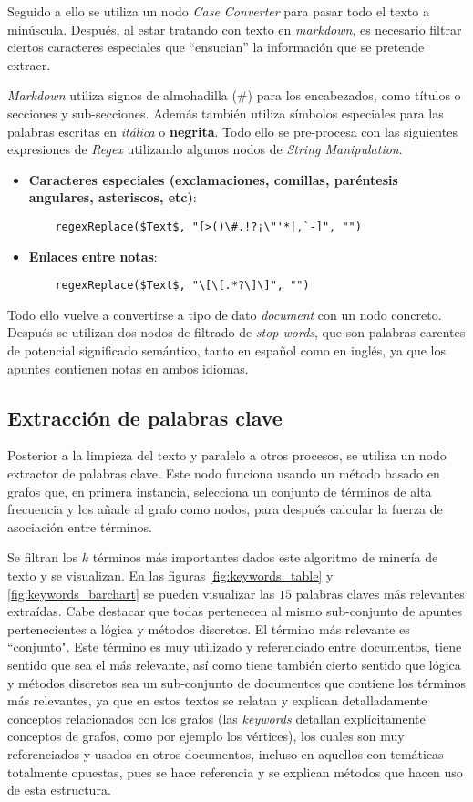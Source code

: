 \documentclass[12pt,letterpaper]{article}
\begin{document}
Seguido a ello se utiliza un nodo \textit{Case Converter} para pasar todo el texto a minúscula. Después, al estar tratando con texto en \textit{markdown}, es necesario filtrar ciertos caracteres especiales que ``ensucian'' la información que se pretende extraer.

\textit{Markdown} utiliza signos de almohadilla ($\#$) para los encabezados, como títulos o secciones y sub-secciones. Además también utiliza símbolos especiales para las palabras escritas en \textit{itálica} o \textbf{negrita}. Todo ello se pre-procesa con las siguientes expresiones de \textit{Regex} utilizando algunos nodos de \textit{String Manipulation}.
\begin{itemize}
    \item \textbf{Caracteres especiales (exclamaciones, comillas, paréntesis angulares, asteriscos, etc)}:
          \begin{verbatim}
    regexReplace($Text$, "[>()\#.!?¡\"'*|,`-]", "")
    \end{verbatim}

    \item \textbf{Enlaces entre notas}:
          \begin{verbatim}
    regexReplace($Text$, "\[\[.*?\]\]", "")
    \end{verbatim}
\end{itemize}
Todo ello vuelve a convertirse a tipo de dato \textit{document} con un nodo concreto. Después se utilizan dos nodos de filtrado de \textit{stop words}, que son palabras carentes de potencial significado semántico, tanto en español como en inglés, ya que los apuntes contienen notas en ambos idiomas.

\subsection{Extracción de palabras clave}
Posterior a la limpieza del texto y paralelo a otros procesos, se utiliza un nodo extractor de palabras clave. Este nodo funciona usando un método basado en grafos que, en primera instancia, selecciona un conjunto de términos de alta frecuencia y los añade al grafo como nodos, para después calcular la fuerza de asociación entre términos.

Se filtran los $k$ términos más importantes dados este algoritmo de minería de texto y se visualizan. En las figuras \ref{fig:keywords_table} y \ref{fig:keywords_barchart} se pueden visualizar las $15$ palabras claves más relevantes extraídas. Cabe destacar que todas pertenecen al mismo sub-conjunto de apuntes pertenecientes a lógica y métodos discretos. El término más relevante es ``conjunto". Este término es muy utilizado y referenciado entre documentos, tiene sentido que sea el más relevante, así como tiene también cierto sentido que lógica y métodos discretos sea un sub-conjunto de documentos que contiene los términos más relevantes, ya que en estos textos se relatan y explican detalladamente conceptos relacionados con los grafos (las \textit{keywords} detallan explícitamente conceptos de grafos, como por ejemplo los vértices), los cuales son muy referenciados y usados en otros documentos, incluso en aquellos con temáticas totalmente opuestas, pues se hace referencia y se explican métodos que hacen uso de esta estructura.
\end{document}
